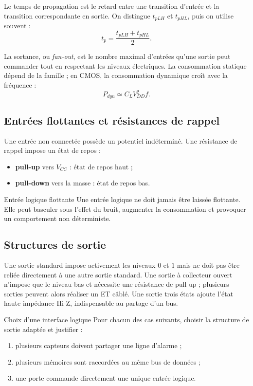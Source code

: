 Le temps de propagation est le retard entre une transition d'entrée et la transition correspondante en sortie. On distingue $t_{pLH}$ et $t_{pHL}$, puis on utilise souvent :
\[
\boxed{t_p=\frac{t_{pLH}+t_{pHL}}{2}.}
\]

La sortance, ou \textit{fan-out}, est le nombre maximal d'entrées qu'une sortie peut commander tout en respectant les niveaux électriques. La consommation statique dépend de la famille ; en CMOS, la consommation dynamique croît avec la fréquence :
\[
P_{dyn}\simeq C_LV_{DD}^2f.
\]

\subsection{Entrées flottantes et résistances de rappel}

Une entrée non connectée possède un potentiel indéterminé. Une résistance de rappel impose un état de repos :
\begin{itemize}
  \item \textbf{pull-up} vers $V_{CC}$ : état de repos haut ;
  \item \textbf{pull-down} vers la masse : état de repos bas.
\end{itemize}


\begin{TLLogicWarning}{Entrée logique flottante}
Une entrée logique ne doit jamais être laissée flottante. Elle peut basculer sous l'effet du bruit, augmenter la consommation et provoquer un comportement non déterministe.
\end{TLLogicWarning}

\subsection{Structures de sortie}

\begin{center}\TLSortiesLogiques\end{center}

Une sortie standard impose activement les niveaux $0$ et $1$ mais ne doit pas être reliée directement à une autre sortie standard. Une sortie à collecteur ouvert n'impose que le niveau bas et nécessite une résistance de pull-up ; plusieurs sorties peuvent alors réaliser un ET câblé. Une sortie trois états ajoute l'état haute impédance Hi-Z, indispensable au partage d'un bus.

\begin{TLLogicApplication}{Choix d'une interface logique}
Pour chacun des cas suivants, choisir la structure de sortie adaptée et justifier :
\begin{enumerate}
  \item plusieurs capteurs doivent partager une ligne d'alarme ;
  \item plusieurs mémoires sont raccordées au même bus de données ;
  \item une porte commande directement une unique entrée logique.
\end{enumerate}
\end{TLLogicApplication}
